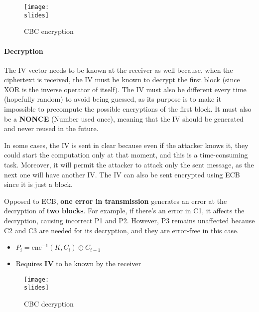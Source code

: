 \begin{figure}[H]
    \centering
    \texttt{[image: \\slides]}
    \caption{CBC encryption}
\end{figure}


\paragraph{Decryption}
The IV vector needs to be known at the receiver as well because, when the ciphertext is received, the IV must be known to decrypt the first block (since XOR is the inverse operator of itself).
The IV must also be different every time (hopefully random) to avoid being guessed, as its purpose is to make it impossible to precompute the possible encryptions of the first block.
It must also be a \textbf{NONCE} (Number used once), meaning that the IV should be generated and never reused in the future.

In some cases, the IV is sent in clear because even if the attacker knows it, they could start the computation only at that moment, and this is a time-consuming task. Moreover, it will permit the attacker to attack only the sent message, as the next one will have another IV.
The IV can also be sent encrypted using ECB since it is just a block.

Opposed to ECB, \textbf{one error in transmission} generates an error at the
decryption of \textbf{two blocks}. For example, if there's an error in C1, it affects the decryption, causing incorrect P1 and P2. However, P3 remains unaffected because C2 and C3 are needed for its decryption, and they are error-free in this case.


\begin{itemize}
    \item $P_i = \text{enc}^{-1}(K, C_i ) \oplus C_{i-1}$
    \item Requires \textbf{IV} to be known by the receiver
\end{itemize}


\begin{figure}[H]
    \centering
    \texttt{[image: \\slides]}
    \caption{CBC decryption}
\end{figure}



